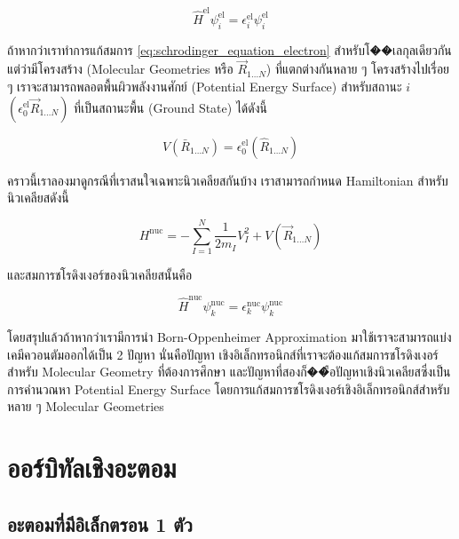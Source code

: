 \begin{equation}
  \label{eq:schrodinger_equation_electron}
  \hat{H}^{\text{el}} \psi^{\text{el}}_{i}
  =
  \epsilon^{\text{el}}_{i} \psi^{\text{el}}_{i}
\end{equation}

ถ้าหากว่าเราทำการแก้สมการ \eqref{eq:schrodinger_equation_electron} สำหรับโ��เลกุลเดียวกันแต่ว่ามีโครงสร้าง (Molecular Geometries
หรือ $\vec{R}_{1 \dots N}$) ที่แตกต่างกันหลาย ๆ โครงสร้างไปเรื่อย ๆ เราจะสามารถพลอตพื้นผิวพลังงานศักย์ (Potential Energy Surface)
สำหรับสถานะ $i$ $(\epsilon^{\text{el}}_{0} \vec{R}_{1 \dots N})$ ที่เป็นสถานะพื้น (Ground State) ได้ดังนี้

\begin{equation}
  V\left(\bar{R}_{1 \dots N}\right)
  =
  \epsilon_{0}^{\mathrm{el}}\left(\hat{R}_{1 \dots N}\right)
\end{equation}

คราวนี้เราลองมาดูกรณีที่เราสนใจเฉพาะนิวเคลียสกันบ้าง เราสามารถกำหนด Hamiltonian สำหรับนิวเคลียสดังนี้

\begin{equation}
  \label{eq:hamiltonian_operator_nuclei}
  H^{\text{nuc}}
  =
  - \sum_{I=1}^{N} \frac{1}{2 m_{I}} V_{I}^{2}
  + V\left(\vec{R}_{1 \dots N}\right)
\end{equation}

\noindent และสมการชโรดิงเงอร์ของนิวเคลียสนั้นคือ

\begin{equation}
  \label{eq:schrodinger_equation_nuclei}
  \hat{H}^{\text{nuc}} \psi^{\text{nuc}}_{k}
  =
  \epsilon^{\text{nuc}}_{k} \psi^{\text{nuc}}_{k}
\end{equation}

โดยสรุปแล้วถ้าหากว่าเรามีการนำ Born-Oppenheimer Approximation มาใช้เราจะสามารถแบ่งเคมีควอนตัมออกได้เป็น 2 ปัญหา นั่นคือปัญหา%
เชิงอิเล็กทรอนิกส์ที่เราจะต้องแก้สมการชโรดิงเงอร์สำหรับ Molecular Geometry ที่ต้องการศึกษา และปัญหาที่สองก็��ือปัญหาเชิงนิวเคลียสซึ่งเป็น%
การคำนวณหา Potential Energy Surface โดยการแก้สมการชโรดิงเงอร์เชิงอิเล็กทรอนิกส์สำหรับหลาย ๆ Molecular Geometries

\section{ออร์บิทัลเชิงอะตอม}

\subsection{อะตอมที่มีอิเล็กตรอน 1 ตัว}

